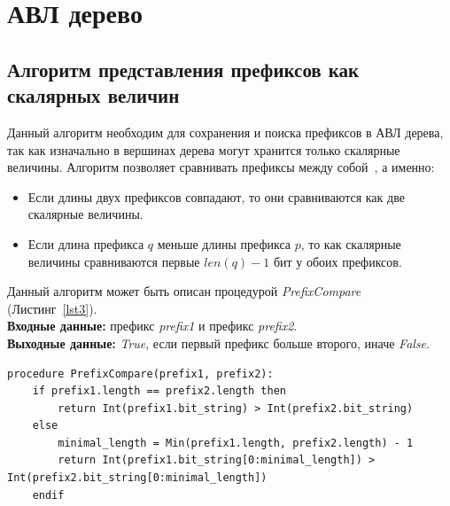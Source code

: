 \documentclass[a4paper, 12pt, titlepage, finall]{extreport}
\begin{document}
        \section{АВЛ дерево}
            \subsection{Алгоритм представления префиксов как скалярных величин}
                Данный алгоритм необходим для сохранения и поиска префиксов в АВЛ дерева, так как изначально в вершинах дерева могут хранится только скалярные величины.
                Алгоритм позволяет сравнивать префиксы между собой~\cite{behdadfar2011coded}, а именно:
                \begin{itemize}
                    \item Если длины двух префиксов совпадают, то они сравниваются как две скалярные величины.
                    \item Если длина префикса $q$ меньше длины префикса $p$, то как скалярные величины сравниваются первые $len(q) - 1$ бит у обоих префиксов.
                \end{itemize}
                Данный алгоритм может быть описан процедурой \emph{PrefixCompare} (Листинг~\ref{lst3}).\\
                {\bf Входные данные:} префикс \emph{prefix1} и префикс \emph{prefix2}.\\
                {\bf Выходные данные:} \emph{True}, если первый префикс больше второго, иначе \emph{False}.
\\
\begin{lstlisting}[frame=lines, caption=Процедура сравнения префиксов как скалярных величин., label=lst3]
procedure PrefixCompare(prefix1, prefix2):
    if prefix1.length == prefix2.length then
        return Int(prefix1.bit_string) > Int(prefix2.bit_string)
    else
        minimal_length = Min(prefix1.length, prefix2.length) - 1
        return Int(prefix1.bit_string[0:minimal_length]) > Int(prefix2.bit_string[0:minimal_length])
    endif
\end{lstlisting}
\end{document}
